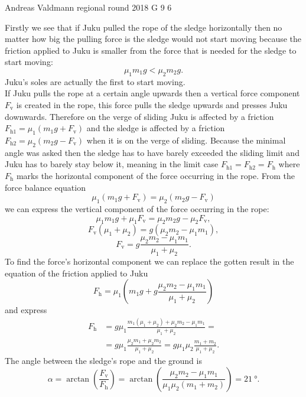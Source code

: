 \documentclass[11pt]{article}
\begin{document}
{Andreas Valdmann} %
{regional round} %
{2018} %
{G 9} %
{6} %
{

\ifEngSolution
Firstly we see that if Juku pulled the rope of the sledge horizontally then no matter how big the pulling force is the sledge would not start moving because the friction applied to Juku is smaller from the force that is needed for the sledge to start moving:
\[
\mu_1 m_1 g < \mu_2 m_2 g.
\]
Juku’s soles are actually the first to start moving.\\
If Juku pulls the rope at a certain angle upwards then a vertical force component $F_{\mathrm{v}}$ is created in the rope, this force pulls the sledge upwards and presses Juku downwards. Therefore on the verge of sliding Juku is affected by a friction $F_{\mathrm{h}1} = \mu_1 \left(m_1 g + F_{\mathrm{v}}\right)$ and the sledge is affected by a friction $F_{\mathrm{h}2} = \mu_2 \left(m_2 g - F_{\mathrm{v}}\right)$ when it is on the verge of sliding. Because the minimal angle was asked then the sledge has to have barely exceeded the sliding limit and Juku has to barely stay below it, meaning in the limit case $F_{\mathrm{h}1} = F_{\mathrm{h}2} = F_{\mathrm{h}}$ where $F_{\mathrm{h}}$ marks the horizontal component of the force occurring in the rope. From the force balance equation
\begin{equation*}
\mu_1 \left(m_1 g + F_{\mathrm{v}}\right) = \mu_2 \left(m_2 g - F_{\mathrm{v}}\right)
\end{equation*}
we can express the vertical component of the force occurring in the rope:
\begin{equation*}
\mu_1 m_1 g + \mu_1 F_{\mathrm{v}} = \mu_2 m_2 g - \mu_2 F_{\mathrm{v}},
\end{equation*}
\begin{equation*}
F_{\mathrm{v}} \left(\mu_1 + \mu_2\right) = g\left(\mu_2 m_2 - \mu_1 m_1\right),
\end{equation*}
\begin{equation*}
F_{\mathrm{v}} = g\frac{\mu_2 m_2 - \mu_1 m_1}{\mu_1 + \mu_2}.
\end{equation*}
To find the force’s horizontal component we can replace the gotten result in the equation of the friction applied to Juku
\begin{equation*}
F_{\mathrm{h}} = \mu_1 \left(m_1 g + g\frac{\mu_2 m_2 - \mu_1 m_1}{\mu_1 + \mu_2}\right)
\end{equation*}
and express
\begin{align*}
F_{\mathrm{h}} &= g \mu_1 \frac{m_1 \left(\mu_1 + \mu_2\right) + \mu_2 m_2 - \mu_1 m_1}{\mu_1 + \mu_2} = \\
&= g \mu_1 \frac{\mu_2 m_1 + \mu_2 m_2}{\mu_1 + \mu_2} = g\mu_1\mu_2\frac{m_1+m_2}{\mu_1+\mu_2}.
\end{align*}
The angle between the sledge’s rope and the ground is
\begin{equation*}
\alpha = \arctan\left(\frac{F_{\mathrm{v}}}{F_{\mathrm{h}}}\right) = \arctan\left(\frac{\mu_2 m_2 - \mu_1 m_1}{\mu_1 \mu_2 \left(m_1 + m_2\right)}\right) = \SI{21}{\degree}.
\end{equation*}
\fi
}
\end{document}

